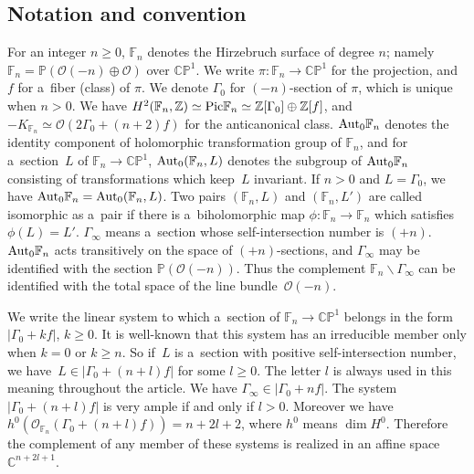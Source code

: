 \documentclass[pdftex]{sigma}
\numberwithin{equation}{section}
\begin{document}
\subsection{Notation and convention}
\label{ss:notation}

For an integer $n\ge 0$, $\mathbb{F}_n$ denotes the Hirzebruch surface of degree $n$; namely $\mathbb{F}_n=\mathbb
P(\mathscr O(-n)\oplus \mathscr O)$ over $\mathbb{CP}^1$.
We write $\pi:\mathbb{F}_n\to\mathbb{CP}^1$ for the projection, and $f$ for a~f\/iber (class) of $\pi$.
We denote $\Gamma_0$ for $(-n)$-section of $\pi$, which is unique when $n>0$.
We have $H^2(\mathbb{F}_n,\mathbb{Z})\simeq {\rm{Pic}}\mathbb{F}_n\simeq \mathbb{Z}[\Gamma_0]\oplus\mathbb{Z}[f]$, and
$-K_{\mathbb{F}_n}\simeq \mathscr O(2\Gamma_0 + (n+2)f)$ for the anticanonical class.
${\rm{Aut}}_0\mathbb{F}_n$ denotes the identity component of holomorphic transformation group of $\mathbb{F}_n$, and
for a~section~$L$ of $\mathbb{F}_n\to\mathbb{CP}^1$, ${\rm{Aut}}_0(\mathbb{F}_n,L)$ denotes the subgroup of
${\rm{Aut}}_0\mathbb{F}_n$ consisting of transformations which keep~$L$ invariant.
If $n>0$ and $L=\Gamma_0$, we have ${\rm{Aut}}_0\mathbb{F}_n= {\rm{Aut}}_0(\mathbb{F}_n,L)$.
Two pairs $(\mathbb{F}_n,L)$ and $(\mathbb{F}_n,L')$ are called isomorphic as a~pair if there is a~biholomorphic map
$\phi:\mathbb{F}_n \to \mathbb{F}_n$ which satisf\/ies $\phi(L) = L'$.
$\Gamma_{\infty}$ means a~section whose self-intersection number is $(+n)$.
${\rm{Aut}}_0\mathbb{F}_n$ acts transitively on the space of $(+n)$-sections, and $\Gamma_{\infty}$ may be
identif\/ied with the section $\mathbb P(\mathscr O(-n))$.
Thus the complement $\mathbb{F}_n\backslash \Gamma_{\infty}$ can be identif\/ied with the total space of the line bundle~$\mathscr O(-n)$.

We write the linear system to which a~section of $\mathbb{F}_n\to\mathbb{CP}^1$ belongs in the form $|\Gamma_0+kf|$, $k\ge 0$.
It is well-known that this system has an irreducible member only when $k=0$ or $k\ge n$.
So if~$L$ is a~section with positive self-intersection number, we have~$L\in |\Gamma_0 + (n+l)f|$ for some $l\ge 0$.
The letter $l$ is always used in this meaning throughout the article.
We have $\Gamma_{\infty}\in |\Gamma_0+nf|$.
The system $|\Gamma_0 + (n+l)f|$ is very ample if and only if $l>0$.
Moreover we have $h^0(\mathscr O_{\mathbb{F}_n}(\Gamma_0+(n+l)f))= n+2l+2$, where $h^0$ means $\dim H^0$.
Therefore the complement of any member of these systems is realized in an af\/f\/ine space $\mathbb{C}^{n+2l+1}$.
\end{document}
